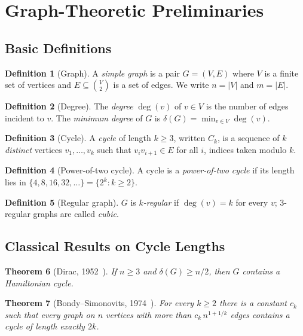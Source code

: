 \documentclass[11pt,a4paper]{article}
\newtheorem{theorem}{Theorem}[section]
\theoremstyle{definition}
\newtheorem{definition}[theorem]{Definition}
\newcommand{\C}[1]{C_{#1}}
\begin{document}
\section{Graph-Theoretic Preliminaries}

\subsection{Basic Definitions}

\begin{definition}[Graph]
A \emph{simple graph} is a pair $G=(V,E)$ where $V$ is a finite set of
vertices and $E\subseteq\binom{V}{2}$ is a set of edges. We write $n=|V|$
and $m=|E|$.
\end{definition}

\begin{definition}[Degree]
The \emph{degree} $\deg(v)$ of $v\in V$ is the number of edges incident to
$v$. The \emph{minimum degree} of $G$ is $\delta(G)=\min_{v\in V}\deg(v)$.
\end{definition}

\begin{definition}[Cycle]
A \emph{cycle} of length $k\ge3$, written $\C k$, is a sequence of $k$
\emph{distinct} vertices $v_1,\dots,v_k$ such that $v_iv_{i+1}\in E$ for all
$i$, indices taken modulo $k$.
\end{definition}

\begin{definition}[Power-of-two cycle]
A cycle is a \emph{power-of-two cycle} if its length lies in
$\{4,8,16,32,\dots\}=\{2^k : k\ge2\}$.
\end{definition}

\begin{definition}[Regular graph]
$G$ is \emph{$k$-regular} if $\deg(v)=k$ for every $v$; $3$-regular graphs
are called \emph{cubic}.
\end{definition}

\subsection{Classical Results on Cycle Lengths}

\begin{theorem}[Dirac, 1952~\cite{dirac}]
If $n\ge3$ and $\delta(G)\ge n/2$, then $G$ contains a Hamiltonian cycle.
\end{theorem}

\begin{theorem}[Bondy--Simonovits, 1974~\cite{bondy-simonovits}]
For every $k\ge2$ there is a constant $c_k$ such that every graph on $n$
vertices with more than $c_k\,n^{1+1/k}$ edges contains a cycle of length
exactly $2k$.
\end{theorem}
\end{document}
